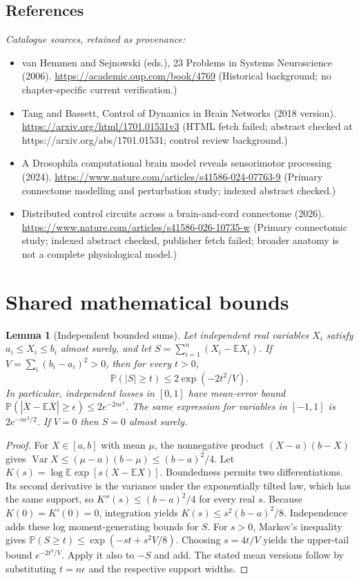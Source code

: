 \documentclass[11pt]{article}
\newcommand{\E}{\mathbb E}
\newcommand{\Prob}{\mathbb P}
\DeclareMathOperator{\Var}{Var}
\providecommand{\E}{\mathbb E}
\providecommand{\Prob}{\mathbb P}
\providecommand{\Var}{\operatorname{Var}}
\newtheorem{sharedlemma}{Lemma}[section]
\begin{document}
\subsection{References}
\noindent\emph{Catalogue sources, retained as provenance:}
\begin{itemize}
\item van Hemmen and Sejnowski (eds.), 23 Problems in Systems Neuroscience (2006). \url{https://academic.oup.com/book/4769} (Historical background; no chapter-specific current verification.)
\item Tang and Bassett, Control of Dynamics in Brain Networks (2018 version). \url{https://arxiv.org/html/1701.01531v3} (HTML fetch failed; abstract checked at https://arxiv.org/abs/1701.01531; control review background.)
\item A Drosophila computational brain model reveals sensorimotor processing (2024). \url{https://www.nature.com/articles/s41586-024-07763-9} (Primary connectome modelling and perturbation study; indexed abstract checked.)
\item Distributed control circuits across a brain-and-cord connectome (2026). \url{https://www.nature.com/articles/s41586-026-10735-w} (Primary connectomic study; indexed abstract checked, publisher fetch failed; broader anatomy is not a complete physiological model.)
\end{itemize}
\clearpage


\appendix
\section{Shared mathematical bounds}\label{app:bounds}
\begin{sharedlemma}[Independent bounded sums]\label{lem:bounded}
Let independent real variables $X_i$ satisfy $a_i\leq X_i\leq b_i$ almost surely,
and let $S=\sum_{i=1}^n(X_i-\E X_i)$. If
$V=\sum_i(b_i-a_i)^2>0$, then for every $t>0$,
\[
 \Prob(|S|\geq t)\leq 2\exp(-2t^2/V).
\]
In particular, independent losses in $[0,1]$ have mean-error bound
$\Prob(|\overline X-\E\overline X|\geq\epsilon)
\leq2e^{-2n\epsilon^2}$. The same expression for variables in $[-1,1]$
is $2e^{-n\epsilon^2/2}$. If $V=0$ then $S=0$ almost surely.
\end{sharedlemma}
\begin{proof}
For $X\in[a,b]$ with mean $\mu$, the nonnegative product
$(X-a)(b-X)$ gives
$\Var X\leq(\mu-a)(b-\mu)\leq(b-a)^2/4$.
Let $K(s)=\log\E\exp[s(X-\E X)]$.
Boundedness permits two differentiations. Its second derivative is the variance
under the exponentially tilted law, which has the same support, so
$K''(s)\leq(b-a)^2/4$ for every real $s$.
Because $K(0)=K'(0)=0$, integration yields
$K(s)\leq s^2(b-a)^2/8$.
Independence adds these log moment-generating bounds for $S$.
For $s>0$, Markov's inequality gives
$\Prob(S\geq t)\leq\exp(-st+s^2V/8)$.
Choosing $s=4t/V$ yields the upper-tail bound $e^{-2t^2/V}$.
Apply it also to $-S$ and add. The stated mean versions follow by substituting
$t=n\epsilon$ and the respective support widths.
\end{proof}
\end{document}
